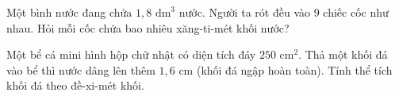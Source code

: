 \begin{ex} %
Một bình nước đang chứa $1{,}8\text{ dm}^3$ nước. Người ta rót đều vào $9$ chiếc cốc như nhau. Hỏi mỗi cốc chứa bao nhiêu xăng-ti-mét khối nước?
\end{ex}

\begin{ex} %
Một bể cá mini hình hộp chữ nhật có diện tích đáy $250\text{ cm}^2$. Thả một khối đá vào bể thì nước dâng lên thêm $1{,}6\text{ cm}$ (khối đá ngập hoàn toàn). Tính thể tích khối đá theo đề-xi-mét khối.
\end{ex}
